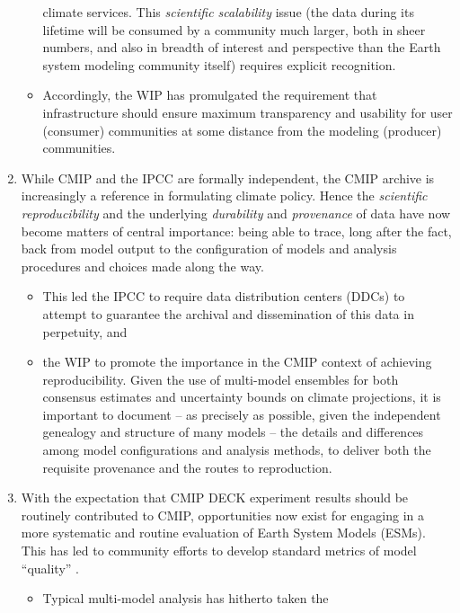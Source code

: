 \documentclass[gmd,manuscript]{copernicus}
\newcommand{\pipref}[1] {\citep{ref:#1}}
\begin{document}
\begin{enumerate}
\begin{itemize}
    climate services. This \emph{scientific scalability} issue
    (the data during its lifetime will be consumed by a community much
    larger, both in sheer numbers, and also in breadth of interest
    and perspective than the Earth system modeling community itself)
    requires explicit recognition.
  \item Accordingly, the WIP has promulgated the requirement that 
    infrastructure should ensure maximum transparency and usability
    for user (consumer) communities at some distance from the modeling
    (producer) communities.
  \end{itemize}
\item\label{repro} While CMIP and the IPCC are formally independent,
  the CMIP archive is increasingly a reference in formulating
  climate policy. Hence the \emph{scientific reproducibility}
  \pipref{collinstabak2014} and the underlying \emph{durability} and
  \emph{provenance} of data have now become matters of central
  importance: being able to trace, long after the fact, back from
  model output to the configuration of models and analysis procedures
  and choices made along the way.
  \begin{itemize}
  \item This led the IPCC to require data distribution centers (DDCs)
    to attempt to guarantee the archival and dissemination of this
    data in perpetuity, and
  \item the WIP to promote the importance in the CMIP context of
    achieving reproducibility. Given the use of multi-model ensembles
    for both consensus estimates and uncertainty bounds on climate
    projections, it is important to document -- as precisely as
    possible, given the independent genealogy and structure of many
    models -- the details and differences among model configurations
    and analysis methods, to deliver both the requisite provenance and
    the routes to reproduction.
  \end{itemize}
\item\label{analysis} With the expectation that CMIP DECK experiment
  results should be routinely contributed to CMIP, opportunities now
  exist for engaging in a more systematic and routine evaluation of
  Earth System Models (ESMs). This has led to community efforts to
  develop standard metrics of model ``quality''
  \citep{ref:eyringetal2016,ref:gleckleretal2016}.
  \begin{itemize}
  \item Typical multi-model analysis has hitherto taken the

\end{itemize}
\end{enumerate}
\end{document}
